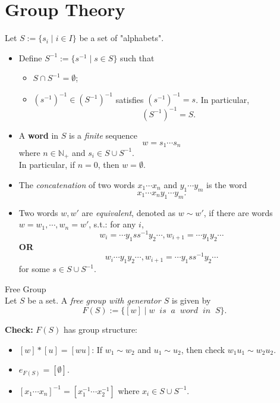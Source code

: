 \chapter{Group Theory}



\begin{definition}
    Let $S:= \{ s_i \mid i \in I\}$ be a set of "alphabets".
    \begin{itemize}
        \item Define $S^{-1} := \{ s^{-1} \mid s\in S\}$ such that
        \begin{itemize}
            \item $S \cap S^{-1} = \emptyset$;
            \item $(s^{-1})^{-1} \in (S^{-1})^{-1}$ satisfies $(s^{-1})^{-1} = s$. In particular,
            $$(S^{-1})^{-1} = S.$$
        \end{itemize}
        \item A \textbf{word} in $S$ is a \textit{finite} sequence $$w=s_1 \cdots s_n$$ where $n \in \mathbb{N}_+$ and $s_i \in S \cup S^{-1}$.\\
        In particular, if $n=0$, then $w= \emptyset$.
        \item The \textit{concatenation} of two words $x_1 \cdots x_n$ and $y_1 \cdots y_m$ is the word
        $$x_1 \cdots x_n y_1 \cdots y_m.$$
        \item Two words $w,w'$ are \textit{equivalent}, denoted as $w \sim w'$, if there are words $w=w_1 ,\cdots, w_n=w'$, s.t.: for any $i$,
        $$w_i = \cdots y_1 ss^{-1}y_2 \cdots, w_{i+1} = \cdots y_1y_2 \cdots$$
        \textbf{OR}
        $$w_i\cdots y_1 y_2 \cdots, w_{i+1} = \cdots y_1 ss^{-1}y_2 \cdots$$
        for some $s \in S\cup S^{-1}$.
    \end{itemize}
\end{definition}

\begin{definition}{Free Group}\\
Let $S$ be a set. A \textit{free group with generator $S$} is given by
$$F(S) := \{ [w] \mid w\;\;is\;\;a\;\;word\;\;in\;\;S \}.$$
\end{definition}

\noindent\textbf{Check:} $F(S)$ has group structure:
\begin{itemize}
    \item $[w] * [u] = [wu]$: If $w_1 \sim w_2$ and $u_1 \sim u_2$, then check $w_1u_1 \sim w_2u_2$.
    \item $e_{F(S)} = [\emptyset]$.
    \item $[x_1 \cdots x_n]^{-1} = [x_1^{-1} \cdots x_2^{-1}]$ where $x_i \in S \cup S^{-1}$.
\end{itemize}

